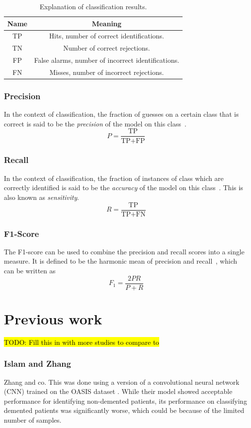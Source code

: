\documentclass{kththesis}
\begin{document}
\begin{table}[H]
  \begin{center}
    \begin{tabular}{cc}
      \textbf{Name} & \textbf{Meaning} \\
      \toprule
      TP & Hits, number of correct identifications. \\
      TN & Number of correct rejections. \\
      FP & False alarms, number of incorrect identifications. \\
      FN & Misses, number of incorrect rejections.
    \end{tabular}
  \end{center}
  \caption{Explanation of classification results.}
  \label{tab:tp_mm}
\end{table}

\subsubsection{Precision}
In the context of classification, the fraction of guesses on a certain class that is correct is said to be the \textit{precision} of the model on this class~\cite[p.~5]{irbook}.
\[ P = \frac{\text{TP}}{\text{TP} + \text{FP}} \]

\subsubsection{Recall}
In the context of classification, the fraction of instances of class which are correctly identified is said to be the \textit{accuracy} of the model on this class~\cite[p.~5]{irbook}. This is also known as \textit{sensitivity}.
\[ R = \frac{\text{TP}}{\text{TP} + \text{FN}} \]

\subsubsection{F1-Score}
The F1-score can be used to combine the precision and recall scores into a single measure. It is defined to be the harmonic mean of precision and recall~\cite[p.~156-167]{irbook}, which can be written as
\[ F_1 = \frac{2PR}{P + R} \]

\section{Previous work}
\hl{TODO: Fill this in with more studies to compare to}
\subsubsection{Islam and Zhang}
Zhang and co.
This was done using a version of a convolutional neural network (CNN) trained on the OASIS dataset \parencite{oasis}. While their model showed acceptable performance for identifying non-demented patients, its performance on classifying demented patients was significantly worse, which could be because of the limited number of samples.
\end{document}
